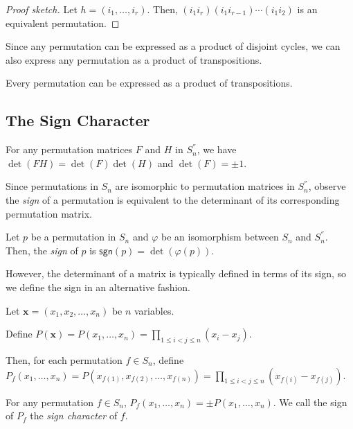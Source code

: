 \documentclass{article}
\begin{document}
\begin{proof}[Proof sketch]
  Let $h = (i_1, \ldots, i_r)$. Then, $(i_1 i_r)(i_1 i_{r-1})\cdots(i_1 i_2)$ is an equivalent permutation.
\end{proof}

Since any permutation can be expressed as a product of disjoint cycles, we can also express any permutation as a product of transpositions.

\begin{proposition}
  Every permutation can be expressed as a product of transpositions.
\end{proposition}

\subsection{The Sign Character}

\begin{lemma}
  For any permutation matrices $F$ and $H$ in $S_n^{''}$, we have $\det(FH) = \det(F)\det(H)$ and $\det(F) = \pm 1$.
\end{lemma}

Since permutations in $S_n$ are isomorphic to permutation matrices in $S_n^{''}$, observe the \emph{sign} of a permutation is equivalent to the determinant of its corresponding permutation matrix.

\begin{example}
  Let $p$ be a permutation in $S_n$ and $\varphi$ be an isomorphism between $S_n$ and $S_n^{''}$. Then, the \emph{sign} of $p$ is $\mathsf{sgn}(p) = \det(\varphi(p))$.
\end{example}

However, the determinant of a matrix is typically defined in terms of its sign, so we define the sign in an alternative fashion.

\begin{definition}
  Let $\mathbf{x} = (x_1, x_2, \ldots, x_n)$ be $n$ variables.

  Define $P(\mathbf{x}) = P(x_1, \ldots, x_n) = \prod\limits_{1 \le i < j \le n}(x_i - x_j)$.

  Then, for each permutation $f \in S_n$, define $P_f(x_1, \ldots, x_n) = P(x_{f(1)}, x_{f(2)}, \ldots, x_{f(n)}) = \prod\limits_{1 \le i < j \le n}(x_{f(i)} - x_{f(j)})$.
\end{definition}

\begin{proposition}
  For any permutation $f \in S_n$, $P_f(x_1, \ldots, x_n) = \pm P(x_1, \ldots, x_n)$. We call the sign of $P_f$ the \emph{sign character} of $f$.
\end{proposition}
\end{document}
